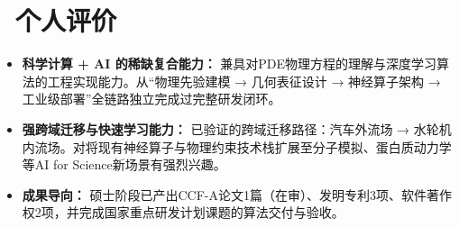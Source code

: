 \documentclass[11pt]{article}
\begin{document}
\section{\makebox[\widthof{\faUser}][c]{\color{CVBlue}\faUser}\ 个人评价}

\begin{itemize}
    \item \textbf{科学计算 + AI 的稀缺复合能力：} 兼具对PDE物理方程的理解与深度学习算法的工程实现能力。从``物理先验建模 → 几何表征设计 → 神经算子架构 → 工业级部署''全链路独立完成过完整研发闭环。
    \item \textbf{强跨域迁移与快速学习能力：} 已验证的跨域迁移路径：汽车外流场 → 水轮机内流场。对将现有神经算子与物理约束技术栈扩展至分子模拟、蛋白质动力学等AI for Science新场景有强烈兴趣。
    \item \textbf{成果导向：} 硕士阶段已产出CCF-A论文1篇（在审）、发明专利3项、软件著作权2项，并完成国家重点研发计划课题的算法交付与验收。
\end{itemize}
\end{document}
